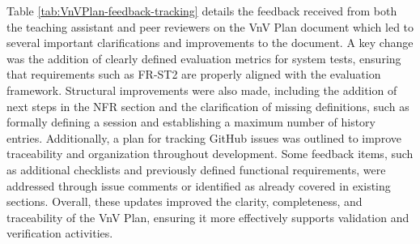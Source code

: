\documentclass{article}
\begin{document}
Table \ref{tab:VnVPlan-feedback-tracking} details the feedback received from both the teaching assistant and peer reviewers on the 
VnV Plan document which led to several important clarifications 
and improvements to the document. A key change was the addition of clearly defined evaluation metrics for system tests, ensuring 
that requirements such as FR-ST2 are properly aligned with the evaluation framework. Structural improvements were 
also made, including the addition of next steps in the NFR section and the clarification of missing definitions, such as formally 
defining a session and establishing a maximum number of history entries. Additionally, a plan for tracking GitHub issues was outlined 
to improve traceability and organization throughout development. Some feedback items, such as additional checklists and previously 
defined functional requirements, were addressed through issue comments or identified as already covered in existing sections. Overall, 
these updates improved the clarity, completeness, and traceability of the VnV Plan, ensuring it more effectively supports validation 
and verification activities.
\end{document}

